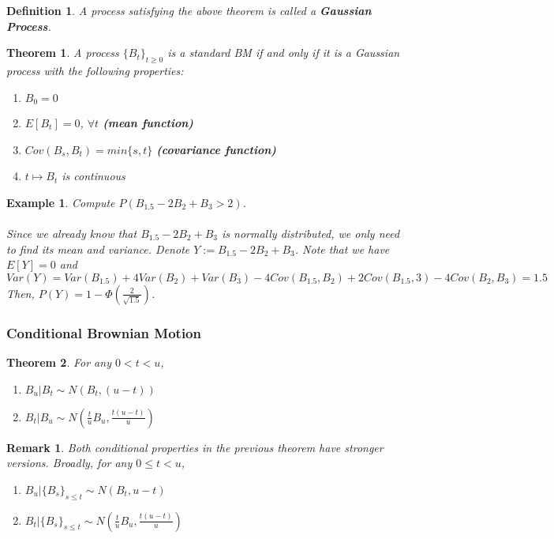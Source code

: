 \documentclass[12pt]{article}
\newtheorem{definition}{Definition}
\newtheorem{theorem}{Theorem}
\newtheorem*{remark}{Remark}
\newtheorem{example}{Example}
\begin{document}
\begin{definition}
    A process satisfying the above theorem is called a \textbf{Gaussian Process}.
\end{definition}

\begin{theorem}
    A process $\{B_t\}_{t\geq 0}$ is a standard BM if and only if it is a Gaussian process with the following properties:
    \begin{enumerate}
        \item $B_0 = 0$
        \item $E[B_t]=0$, $\forall t$ \textbf{(mean function)}
        \item $Cov(B_s,B_t)=min\{s,t\}$ \textbf{(covariance function)}
        \item $t \mapsto B_t$ is continuous
    \end{enumerate}
\end{theorem}

\begin{example}
    Compute $P(B_{1.5}-2B_2+B_3 > 2)$.
    \\
    \\
    Since we already know that $B_{1.5}-2B_2+B_3$ is normally distributed, we only need to find its mean and variance. Denote $Y := B_{1.5}-2B_2+B_3$. Note that we have $E[Y] = 0$ and $Var(Y) = Var(B_{1.5}) + 4Var(B_2) + Var(B_3) - 4Cov(B_{1.5},B_2) + 2Cov(B_{1.5},3) - 4Cov(B_2,B_3) = 1.5$ Then, $P(Y) = 1 - \Phi(\frac{2}{\sqrt{1.5}})$.
\end{example}

\subsubsection{Conditional Brownian Motion}

\begin{theorem}
    For any $0 < t < u$,
    \begin{enumerate}
        \item $B_u | B_t \sim N(B_t,(u-t))$
        \item $B_t | B_u \sim N(\frac{t}{u}B_u, \frac{t(u-t)}{u})$
    \end{enumerate}
\end{theorem}

\begin{remark}
    Both conditional properties in the previous theorem have stronger versions. Broadly, for any $0 \leq t < u$,
    \begin{enumerate}
        \item $B_u| \{B_s\}_{s\leq t} \sim N(B_t, u-t )$
        \item $B_t | \{B_s\}_{s\leq t} \sim N(\frac{t}{u}B_u, \frac{t(u-t)}{u})$
    \end{enumerate}
\end{remark}
\end{document}
